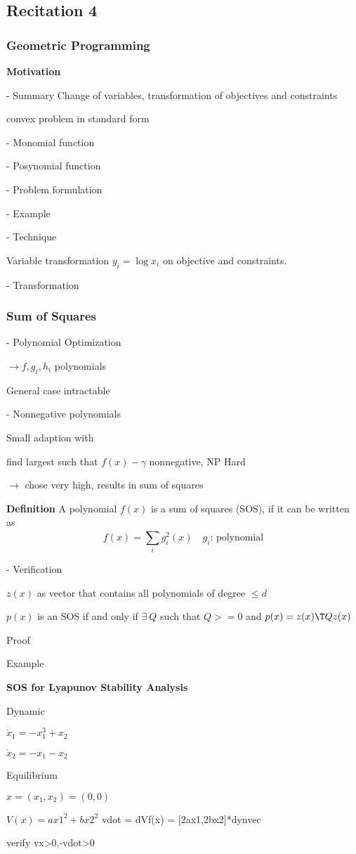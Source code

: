 \subsection{Recitation 4}

\subsubsection{Geometric Programming}

\textbf{Motivation}

- Summary Change of variables, transformation of objectives and constraints

\rightarrow convex problem in standard form

- Monomial function

- Posynomial function

- Problem formulation

- Example

- Technique

Variable transformation $y_i=\log{x_i}$ on objective and constraints.

- Transformation

\subsubsection{Sum of Squares}

- Polynomial Optimization

$\rightarrow f,g_i,h_i$ polynomials

General case intractable

- Nonnegative polynomials

Small adaption with \gamma

find largest \gamma such that $f(x)-\gamma$ nonnegative, NP Hard

$\rightarrow$ chose \gamma very high, results in sum of squares

\textbf{Definition}
A polynomial $f(x)$ is a sum of squares (SOS), if it can be written as
$$f(x) = \displaystyle\sum_{i}^{}g_i^2(x) \quad g_i \text{: polynomial}$$

- Verification

$z(x)$ as vector that contains all polynomials of degree $\le d$

\begin{theorem}[SOS]
	$p(x)$ is an SOS if and only if $\exists\ Q$ such that $Q >=0$ and $p(x)=z(x)\T Qz(x)$
\end{theorem}

Proof

Example

\textbf{SOS for Lyapunov Stability Analysis}

Dynamic

$\dot{x}_1 = -x_1^3+x_2$

$\dot{x}_2 = -x_1-x_2$

Equilibrium


$x = (x_1,x_2) = (0,0)$

$V(x) = ax1^2+bx2^2$
vdot = dVf(x)
= [2ax1,2bx2]*dynvec

verify vx>0,-vdot>0
